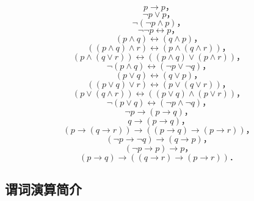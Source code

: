 \[ p \rightarrow p                                                                                 \text{，} \tag{同一律} \]
\[ \lnot{}p \lor p                                                                                 \text{，} \tag{排中律} \]
\[ \lnot(\lnot{}p \land p)                                                                         \text{，} \tag{矛盾律} \]
\[ \lnot\lnot{}p \leftrightarrow p                                                                 \text{，} \tag{双重否定律} \]
\[ (p \land q) \leftrightarrow (q \land p)                                                         \text{，} \tag{合取交换律} \]
\[ ((p \land q) \land r) \leftrightarrow (p \land (q \land r))                                     \text{，} \tag{合取结合律} \]
\[ (p \land (q \lor r)) \leftrightarrow ((p \land q) \lor (p \land r))                             \text{，} \tag{分配律} \]
\[ \lnot(p \land q) \leftrightarrow (\lnot{}p \lor \lnot{}q)                                       \text{，} \tag{德·摩根律} \]
\[ (p \lor q) \leftrightarrow (q \lor p)                                                           \text{，} \tag{析取交换律} \]
\[ ((p \lor q) \lor r) \leftrightarrow (p \lor (q \lor r))                                         \text{，} \tag{析取结合律} \]
\[ (p \lor (q \land r)) \leftrightarrow ((p \lor q) \land (p \lor r))                              \text{，} \tag{分配律} \]
\[ \lnot(p \lor q) \leftrightarrow (\lnot{}p \land \lnot{}q)                                       \text{，} \tag{德·摩根律} \]
\[ \lnot{}p \rightarrow (p \rightarrow q)                                                          \text{，} \tag{否定前件律} \]
\[ q \rightarrow (p \rightarrow q)                                                                 \text{，} \tag{肯定后件律} \]
\[ (p \rightarrow (q \rightarrow r)) \rightarrow ((p \rightarrow q) \rightarrow (p \rightarrow r)) \text{，} \tag{蕴含词分配律} \]
\[ (\lnot{}p \rightarrow \lnot{}q) \rightarrow (q \rightarrow p)                                   \text{，} \tag{换位律} \]
\[ (\lnot{}p \rightarrow p) \rightarrow p                                                          \text{，} \tag{否定肯定律} \]
\[ (p \rightarrow q) \rightarrow ((q \rightarrow r) \rightarrow (p \rightarrow r))                 \text{．} \tag{假设三段论} \]

\subsection{谓词演算简介}

